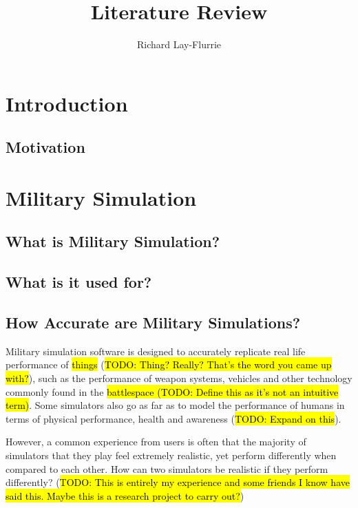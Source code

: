 \documentclass{article}
\title{Literature Review}
\author{Richard Lay-Flurrie}
\begin{document}
\maketitle

\tableofcontents



\section{Introduction}

\subsection{Motivation}

\section{Military Simulation}

\subsection{What is Military Simulation?}

\subsection{What is it used for?}

\subsection{How Accurate are Military Simulations?}

Military simulation software is designed to accurately replicate real life performance of \hl{things} (\hl{TODO: Thing? Really? That's the word you came up with?}), such as the performance of weapon systems, vehicles and other technology commonly found in the \hl{battlespace (TODO: Define this as it's not an intuitive term)}. Some simulators also go as far as to model the performance of humans in terms of physical performance, health and awareness (\hl{TODO: Expand on this}).

However, a common experience from users is often that the majority of simulators that they play feel extremely realistic, yet perform differently when compared to each other. How can two simulators be realistic if they perform differently? (\hl{TODO: This is entirely my experience and some friends I know have said this. Maybe this is a research project to carry out?})
\end{document}

